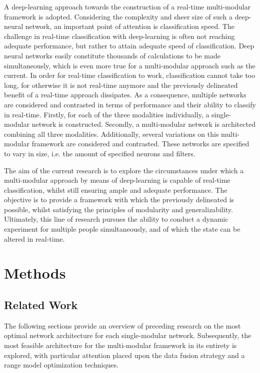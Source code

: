 \documentclass[12pt]{article}
\begin{document}
A deep-learning approach towards the construction of a real-time multi-modular framework is adopted. Considering the complexity and sheer size of such a deep-neural network, an important point of attention is classification speed. The challenge in real-time classification with deep-learning is often not reaching adequate performance, but rather to attain adequate speed of classification. Deep neural networks easily constitute thousands of calculations to be made simultaneously, which is even more true for a multi-modular approach such as the current. In order for real-time classification to work, classification cannot take too long, for otherwise it is not real-time anymore and the previously delineated benefit of a real-time approach dissipates. As a consequence, multiple networks are considered and contrasted in terms of performance and their ability to classify in real-time. Firstly, for each of the three modalities individually, a single-modular network is constructed. Secondly, a multi-modular network is architected combining all three modalities. Additionally, several variations on this multi-modular framework are considered and contrasted. These networks are specified to vary in size, i.e. the amount of specified neurons and filters. 

The aim of the current research is to explore the circumstances under which a multi-modular approach by means of deep-learning is capable of real-time classification, whilst still ensuring ample and adequate performance. The objective is to provide a framework with which the previously delineated is possible, whilst satisfying the principles of modularity and generalizability. Ultimately, this line of research pursues the ability to conduct a dynamic experiment for multiple people simultaneously, and of which the state can be altered in real-time. 

\newpage
\section{Methods}

\subsection{Related Work} 
The following sections provide an overview of preceding research on the most optimal network architecture for each single-modular network. Subsequently, the most feasible architecture for the multi-modular framework in its entirety is explored, with particular attention placed upon the data fusion strategy and a range model optimization techniques.
\end{document}
